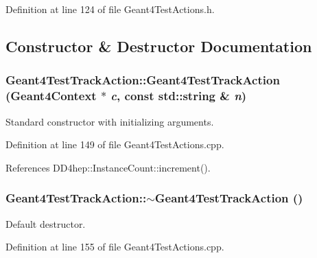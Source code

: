 Definition at line 124 of file Geant4TestActions.h.

\subsection{Constructor \& Destructor Documentation}
\hypertarget{class_d_d4hep_1_1_simulation_1_1_test_1_1_geant4_test_track_action_a5dcd49bcdb620730e97cb2f6b3c3cd0d}{
\subsubsection[{Geant4TestTrackAction}]{\setlength{\rightskip}{0pt plus 5cm}Geant4TestTrackAction::Geant4TestTrackAction ({\bf Geant4Context} $\ast$ {\em c}, \/  const std::string \& {\em n})}}
\label{class_d_d4hep_1_1_simulation_1_1_test_1_1_geant4_test_track_action_a5dcd49bcdb620730e97cb2f6b3c3cd0d}


Standard constructor with initializing arguments. 

Definition at line 149 of file Geant4TestActions.cpp.

References DD4hep::InstanceCount::increment().\hypertarget{class_d_d4hep_1_1_simulation_1_1_test_1_1_geant4_test_track_action_aede90b2245482e02e82e959b30a1e2df}{
\subsubsection[{$\sim$Geant4TestTrackAction}]{\setlength{\rightskip}{0pt plus 5cm}Geant4TestTrackAction::$\sim$Geant4TestTrackAction ()}}
\label{class_d_d4hep_1_1_simulation_1_1_test_1_1_geant4_test_track_action_aede90b2245482e02e82e959b30a1e2df}


Default destructor. 

Definition at line 155 of file Geant4TestActions.cpp.

